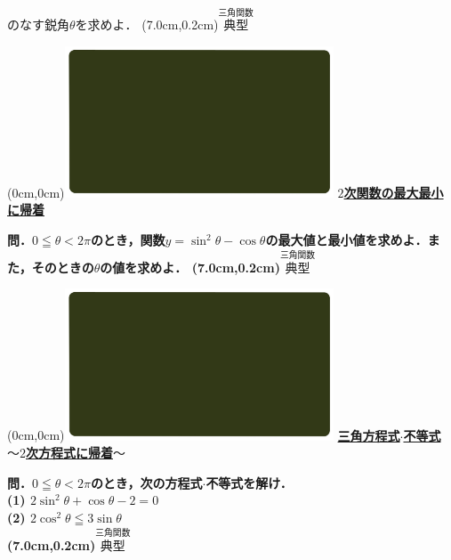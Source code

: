 \documentclass[10pt,
fleqn,
dvipdfmx,
uplatex
]{jsarticle}
\begin{document}
のなす鋭角$\theta$を求めよ．
\at(7.0cm,0.2cm){\small\color{bradorange}$\overset{\text{三角関数}}{\text{典型}}$}


\newpage



\at(0cm,0cm){\includegraphics[width=8cm,bb=0 0 1920 1080]{./youtube/thumbnails/templates/smart_background/三角関数.jpeg}}
{\color{orange}\bf\boldmath\LARGE\underline{$2$次関数の最大最小に帰着}}\vspace{0.3zw}

\LARGE 
\bf\boldmath 問．$0\leqq \theta <2\pi$のとき，関数$y=\sin ^2\theta -\cos \theta$の最大値と最小値を求めよ．また，そのときの$\theta$の値を求めよ．
\at(7.0cm,0.2cm){\small\color{bradorange}$\overset{\text{三角関数}}{\text{典型}}$}


\newpage



\at(0cm,0cm){\includegraphics[width=8cm,bb=0 0 1920 1080]{./youtube/thumbnails/templates/smart_background/三角関数.jpeg}}
{\color{orange}\bf\boldmath\normalsize\underline{三角方程式$\cdot$不等式$〜2$次方程式に帰着$〜$}}\vspace{0.3zw}

\Large 
\bf\boldmath 問．$0\leqq \theta <2\pi$のとき，次の方程式$\cdot$不等式を解け．\\
(1)  $2\sin ^2\theta +\cos \theta -2=0$\\
(2)  $2\cos ^2\theta \leqq 3\sin \theta$\\

\at(7.0cm,0.2cm){\small\color{bradorange}$\overset{\text{三角関数}}{\text{典型}}$}
\end{document}
